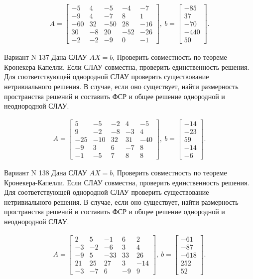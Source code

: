 \documentclass[11pt]{report}
\begin{document}
\begin{align*}
 A = \left[\begin{matrix}-5 & 4 & -5 & -4 & -7\\-9 & 4 & -7 & 8 & 1\\-60 & 32 & -50 & 28 & -16\\30 & -8 & 20 & -52 & -26\\-2 & -2 & -9 & 0 & -1\end{matrix}\right],
\ b = \left[\begin{matrix}-85\\37\\-70\\-440\\50\end{matrix}\right]. 
 \end{align*}

Вариант N 137
Дана СЛАУ $AX = b$,
Проверить совместность по теореме Кронекера-Капелли. Если СЛАУ совместна, проверить единственность решения.
Для соответствующей однородной СЛАУ проверить существование нетривиального решения. В случае, если оно существует,
найти размерность пространства решений и составить ФСР и общее решение однородной  и неоднородной СЛАУ.


\begin{align*}
 A = \left[\begin{matrix}5 & -5 & -2 & 4 & -5\\9 & -2 & -8 & -3 & 4\\-25 & -10 & 32 & 31 & -40\\-9 & 3 & 6 & -7 & 8\\-1 & -5 & 7 & 8 & 8\end{matrix}\right],
\ b = \left[\begin{matrix}-14\\-23\\59\\-14\\-6\end{matrix}\right]. 
 \end{align*}

Вариант N 138
Дана СЛАУ $AX = b$,
Проверить совместность по теореме Кронекера-Капелли. Если СЛАУ совместна, проверить единственность решения.
Для соответствующей однородной СЛАУ проверить существование нетривиального решения. В случае, если оно существует,
найти размерность пространства решений и составить ФСР и общее решение однородной  и неоднородной СЛАУ.


\begin{align*}
 A = \left[\begin{matrix}2 & 5 & -1 & 6 & 2\\-3 & -2 & -6 & 3 & 4\\-9 & 5 & -33 & 33 & 26\\21 & 25 & 27 & 3 & -14\\-3 & -7 & 6 & -9 & 9\end{matrix}\right],
\ b = \left[\begin{matrix}-61\\-87\\-618\\252\\52\end{matrix}\right]. 
 \end{align*}
\end{document}
